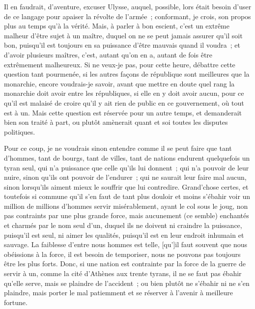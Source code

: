 \documentclass[french,twoside]{book} %
\begin{document}
\noindent Il en faudrait, d’aventure, excuser Ulysse, auquel, possible, lors était besoin d’user de ce langage pour apaiser la révolte de l’armée ; conformant, je crois, son propos plus au temps qu’à la vérité. Mais, à parler à bon escient, c’est un extrême malheur d’être sujet à un maître, duquel on ne se peut jamais assurer qu’il soit bon, puisqu’il est toujours en sa puissance d’être mauvais quand il voudra ; et d’avoir plusieurs maîtres, c’est, autant qu’on en a, autant de fois être extrêmement malheureux. Si ne veux-je pas, pour cette heure, débattre cette question tant pourmenée, si les autres façons de république sont meilleures que la monarchie, encore voudrais-je savoir, avant que mettre en doute quel rang la monarchie doit avoir entre les républiques, si elle en y doit avoir aucun, pour ce qu’il est malaisé de croire qu’il y ait rien de public en ce gouvernement, où tout est à un. Mais cette question est réservée pour un autre temps, et demanderait bien son traité à part, ou plutôt amènerait quant et soi toutes les disputes politiques.\par
Pour ce coup, je ne voudrais sinon entendre comme il se peut faire que tant d’hommes, tant de bourgs, tant de villes, tant de nations endurent quelquefois un tyran seul, qui n’a puissance que celle qu’ils lui donnent ; qui n’a pouvoir de leur nuire, sinon qu’ils ont pouvoir de l’endurer ; qui ne saurait leur faire mal aucun, sinon lorsqu’ils aiment mieux le souffrir que lui contredire. Grand’chose certes, et toutefois si commune qu’il s’en faut de tant plus douloir et moins s’ébahir voir un million de millions d’hommes servir misérablement, ayant le col sous le joug, non pas contraints par une plus grande force, mais aucunement (ce semble) enchantés et charmés par le nom seul d’un, duquel ils ne doivent ni craindre la puissance, puisqu’il est seul, ni aimer les qualités, puisqu’il est en leur endroit inhumain et sauvage. La faiblesse d’entre nous hommes est telle, [qu’]il faut souvent que nous obéissions à la force, il est besoin de temporiser, nous ne pouvons pas toujours être les plus forts. Donc, si une nation est contrainte par la force de la guerre de servir à un, comme la cité d’Athènes aux trente tyrans, il ne se faut pas ébahir qu’elle serve, mais se plaindre de l’accident ; ou bien plutôt ne s’ébahir ni ne s’en plaindre, mais porter le mal patiemment et se réserver à l’avenir à meilleure fortune.\par
\end{document}
